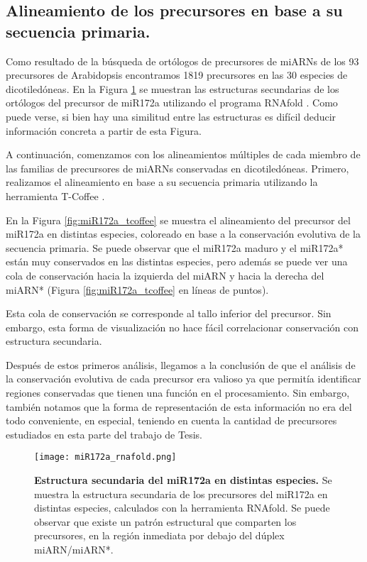 \subsection{Alineamiento de los precursores en base a su secuencia primaria.}

Como resultado de la búsqueda de ortólogos de precursores de miARNs de los 93 precursores de Arabidopsis encontramos 1819 precursores en las 30 especies de dicotiledóneas.
En la Figura \ref{fig:miR172a_rnafold} se muestran las estructuras secundarias de los ortólogos del precursor de miR172a utilizando el programa RNAfold \citep{pmid22115189}.
Como puede verse, si bien hay una similitud entre las estructuras es difícil deducir información concreta a partir de esta Figura.

A continuación, comenzamos con los alineamientos múltiples de cada miembro de las familias de precursores de miARNs conservadas en dicotiledóneas.
Primero, realizamos el alineamiento en base a su secuencia primaria utilizando la herramienta T-Coffee \citep{pmid10964570}.

En la Figura \ref{fig:miR172a_tcoffee} se muestra el alineamiento del precursor del miR172a en distintas especies, coloreado en base a la conservación evolutiva de la secuencia primaria.
Se puede observar que el miR172a maduro y el miR172a* están muy conservados en las distintas especies, pero además se puede ver una cola de conservación hacia la izquierda del miARN y hacia la derecha del miARN* (Figura \ref{fig:miR172a_tcoffee} en líneas de puntos).

Esta cola de conservación se corresponde al tallo inferior del precursor.
Sin embargo, esta forma de visualización no hace fácil correlacionar conservación con estructura secundaria.

Después de estos primeros análisis, llegamos a la conclusión de que el análisis de la conservación evolutiva de cada precursor era valioso ya que permitía identificar regiones conservadas que tienen una función en el procesamiento.
Sin embargo, también notamos que la forma de representación de esta información no era del todo conveniente, en especial, teniendo en cuenta la cantidad de precursores estudiados en esta parte del trabajo de Tesis.

\begin{landscape}
    \begin{figure}[htbp!] 
        \centering    
        \texttt{[image: miR172a\_rnafold.png]}
        \caption[Estructura secundaria del miR172a en distintas especies]{
        \textbf{Estructura secundaria del miR172a en distintas especies.}
        Se muestra la estructura secundaria de los precursores del miR172a en distintas especies, calculados con la herramienta RNAfold.
        Se puede observar que existe un patrón estructural que comparten los precursores, en la región inmediata por debajo del dúplex miARN/miARN*.
        }
        \label{fig:miR172a_rnafold}
    \end{figure}
\end{landscape}

